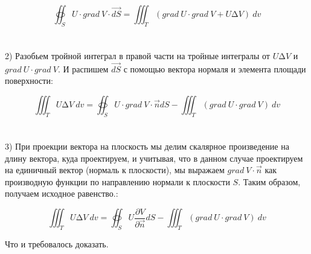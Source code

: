 \documentclass{article}
\begin{document}
\[\oiint_{S}^{\ }{U \cdot grad\ V \cdot \overrightarrow{dS}} = \iiint_{T}^{\ }{(grad\ U \cdot grad\ V + U\mathrm{\Delta}V)\ dv}\]
\\ \\
2) Разобьем тройной интеграл в правой части на тройные интегралы от
\(U\mathrm{\Delta}V\) и \(grad\ U \cdot grad\ V\). И распишем
\(\overrightarrow{dS}\) с помощью вектора нормаля и элемента площади
поверхности:

\[\iiint_{T}^{\ }{U\mathrm{\Delta}V\ dv} = \oiint_{S}^{\ }{U \cdot grad\ V \cdot \overrightarrow{n}dS} - \iiint_{T}^{\ }{(grad\ U \cdot grad\ V)\ dv}\]
\\ \\
3) При проекции вектора на плоскость мы делим скалярное произведение на
длину вектора, куда проектируем, и учитывая, что в данном случае
проектируем на единичный вектор (нормаль к плоскости), мы выражаем
\(grad\ V \cdot \overrightarrow{n}\) как производную функции по
направлению нормали к плоскости \(S\). Таким образом, получаем исходное
равенство.:

\[\iiint_{T}^{\ }{U\mathrm{\Delta}V\ dv} = \oiint_{S}^{\ }{U\frac{\partial V}{\partial\overrightarrow{n}}dS} - \iiint_{T}^{\ }{(grad\ U \cdot grad\ V)\ dv}\]

Что и требовалось доказать.
\end{document}
